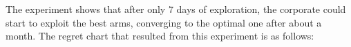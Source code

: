 The experiment shows that after only 7 days of exploration, the corporate could start to exploit the best arms, converging to the optimal one after about a month.
The regret chart that resulted from this experiment is as follows:\\

